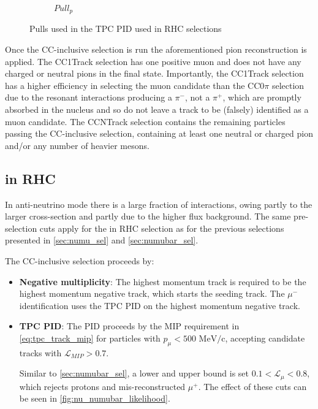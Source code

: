 \begin{figure}[h]
\begin{subfigure}[t]{0.32\textwidth}
		\caption{$Pull_p$}
	\end{subfigure}
	\caption{Pulls used in the TPC PID used in \numubar RHC selections}
	\label{fig:numubar_pulls}
\end{figure}

Once the \numubar CC-inclusive selection is run the aforementioned pion reconstruction is applied. The \numubar CC1Track selection has one positive muon and does not have any charged or neutral pions in the final state. Importantly, the \numubar CC1Track selection has a higher efficiency in selecting the muon candidate than the \numu CC0$\pi$ selection due to the \numubar resonant interactions producing a $\pi^-$, not a $\pi^+$, which are promptly absorbed in the nucleus and so do not leave a track to be (falsely) identified as a muon candidate. The \numubar CCNTrack selection contains the remaining particles passing the \numubar CC-inclusive selection, containing at least one neutral or charged pion and/or any number of heavier mesons.

\subsection{\numu in RHC}
\label{sec:numu_in_nubar_sel}
In anti-neutrino mode there is a large fraction of \numu interactions, owing partly to the larger \numu cross-section and partly due to the higher flux background. The same pre-selection cuts apply for the \numu in RHC selection as for the previous selections presented in \autoref{sec:numu_sel} and \autoref{sec:numubar_sel}.

The CC-inclusive selection proceeds by:
\begin{itemize}
	\item \textbf{Negative multiplicity}: The highest momentum track is required to be the highest momentum negative track, which starts the seeding track. The $\mu^-$ identification uses the TPC PID on the highest momentum negative track. 
	
	\item \textbf{TPC PID}: The PID proceeds by the MIP requirement in \autoref{eq:tpc_track_mip} for particles with $p_\mu < 500 \text{ MeV/c}$, accepting candidate tracks with $\mathcal{L}_{MIP} > 0.7$.
	
	Similar to \autoref{sec:numubar_sel}, a lower and upper bound is set $0.1 < \mathcal{L}_\mu < 0.8$, which rejects protons and mis-reconstructed $\mu^+$. The effect of these cuts can be seen in \autoref{fig:nu_numubar_likelihood}.
\end{itemize}

